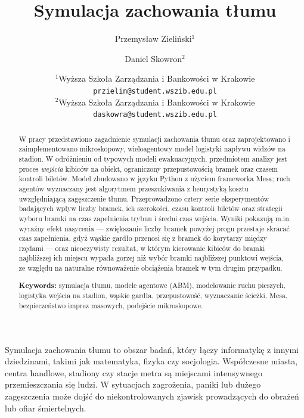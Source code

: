 \documentclass[polish]{projectreport}
\author{Przemysław Zieliński$^1$  \and Daniel Skowron$^2$ }
\title{Symulacja zachowania tłumu}
\date{
	{\small $^1$Wyższa Szkoła Zarządzania i Bankowości w Krakowie \\ \texttt{przielin@student.wszib.edu.pl}\\[1ex]%
	$^2$Wyższa Szkoła Zarządzania i Bankowości w Krakowie \\ \texttt{daskowra@student.wszib.edu.pl}\\[2ex]%
        \the\year}
      }
\begin{document}
\maketitle

\thispagestyle{empty}

\begin{abstract}
\noindent W pracy przedstawiono zagadnienie symulacji zachowania tłumu oraz zaprojektowano i zaimplementowano mikroskopowy, wieloagentowy model logistyki napływu widzów na stadion. W odróżnieniu od typowych modeli ewakuacyjnych, przedmiotem analizy jest proces \textit{wejścia} kibiców na obiekt, ograniczony przepustowością bramek oraz czasem kontroli biletów. Model zbudowano w języku Python z użyciem frameworka Mesa; ruch agentów wyznaczany jest algorytmem przeszukiwania z heurystyką kosztu uwzględniającą zagęszczenie tłumu. Przeprowadzono cztery serie eksperymentów badających wpływ liczby bramek, ich szerokości, czasu kontroli biletów oraz strategii wyboru bramki na czas zapełnienia trybun i średni czas wejścia. Wyniki pokazują m.in. wyraźny efekt nasycenia --- zwiększanie liczby bramek powyżej progu przestaje skracać czas zapełnienia, gdyż wąskie gardło przenosi się z bramek do korytarzy między rzędami --- oraz nieoczywisty rezultat, w którym kierowanie kibiców do bramki najbliższej ich miejscu wypada gorzej niż wybór bramki najbliższej punktowi wejścia, ze względu na naturalne równoważenie obciążenia bramek w tym drugim przypadku.

\noindent\textbf{Keywords:} symulacja tłumu, modele agentowe (ABM), modelowanie ruchu pieszych, logistyka wejścia na stadion, wąskie gardła, przepustowość, wyznaczanie ścieżki, Mesa, bezpieczeństwo imprez masowych, podejście mikroskopowe.
\end{abstract}

\section{\SectionTitleIntroduction}
\label{sec:introduction}

Symulacja zachowania tłumu to obszar badań, który łączy informatykę z innymi dziedzinami, takimi jak matematyka, fizyka czy socjologia. Współczesne miasta, centra handlowe, stadiony czy stacje metra są miejscami intensywnego przemieszczania się ludzi. W sytuacjach zagrożenia, paniki lub dużego zagęszczenia może dojść do niekontrolowanych zjawisk prowadzących do obrażeń lub ofiar śmiertelnych.
\end{document}
